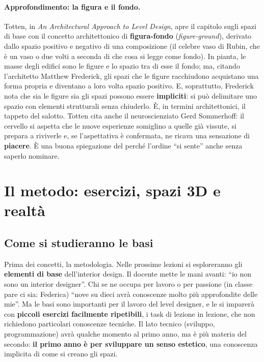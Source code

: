 \paragraph{Approfondimento: la figura e il fondo.} Totten, in \emph{An Architectural
Approach to Level Design}, apre il capitolo sugli spazi di base con il concetto
architettonico di \textbf{figura-fondo} (\emph{figure-ground}), derivato dallo spazio
positivo e negativo di una composizione (il celebre vaso di Rubin, che è un vaso o due
volti a seconda di che cosa si legge come fondo). In pianta, le masse degli edifici
sono le figure e lo spazio tra di esse il fondo; ma, citando l'architetto Matthew
Frederick, gli spazi che le figure racchiudono acquistano una forma propria e diventano
a loro volta spazio positivo. E, soprattutto, Frederick nota che sia le figure sia gli
spazi possono essere \textbf{impliciti}: si può delimitare uno spazio con elementi
strutturali senza chiuderlo. È, in termini architettonici, il tappeto del salotto.
Totten cita anche il neuroscienziato Gerd Sommerhoff: il cervello si aspetta che le
nuove esperienze somiglino a quelle già vissute, si prepara a riviverle e, se
l'aspettativa è confermata, ne ricava una sensazione di \textbf{piacere}. È una buona
spiegazione del perché l'ordine ``si sente'' anche senza saperlo nominare.

\section{Il metodo: esercizi, spazi 3D e realtà}
\label{gd17:sec:metodo}



\subsection{Come si studieranno le basi}

Prima dei concetti, la metodologia. Nelle prossime lezioni si esploreranno gli
\textbf{elementi di base} dell'interior design. Il docente mette le mani avanti: ``io
non sono un interior designer''. Chi se ne occupa per lavoro o per passione (in classe
pare ci sia: Federica) ``nove su dieci avrà conoscenze molto più approfondite delle
mie''. Ma le basi sono importanti per il lavoro del level designer, e le si imparerà con
\textbf{piccoli esercizi facilmente ripetibili}, i task di lezione in lezione, che non
richiedono particolari conoscenze tecniche. Il lato tecnico (sviluppo, programmazione)
avrà qualche momento al primo anno, ma è più materia del secondo: \textbf{il primo anno
è per sviluppare un senso estetico}, una conoscenza implicita di come si creano gli
spazi.

